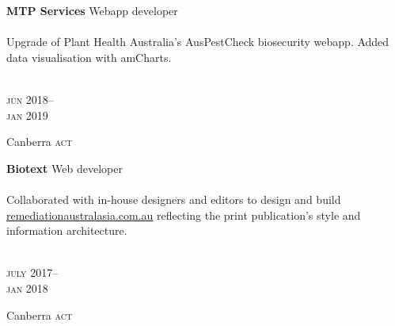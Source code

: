 \begin{minipage}[t]{\mainboxwidth\textwidth}
\textbf{MTP Services}\phantom{..} Webapp developer\\
\\
{\small
Upgrade of Plant Health Australia's AusPestCheck biosecurity webapp. Added 
data visualisation with amCharts.}
\\
\\
{\small
\par}
\end{minipage}
\begin{minipage}[t]{\detailboxwidth\textwidth}
{
\hfill \textsc{jun} 2018--\\ 
\hspace*{0pt} \hfill \textsc{jan} 2019
\par
{\small\hfill Canberra \textsc{act}}
}
\end{minipage}

\begin{minipage}[t]{\mainboxwidth\textwidth}
\textbf{Biotext}\phantom{..} Web developer\\
\\
{\small
Collaborated with in-house designers and editors to design and build 
\href{https://www.remediationaustralasia.com.au/}{remediationaustralasia.com.au} 
reflecting the print publication's style and information architecture.
}
\\
\\
{\small
\par}
\end{minipage}
\begin{minipage}[t]{\detailboxwidth\textwidth}
{
\hfill \textsc{july} 2017--\\ 
\hspace*{0pt} \hfill \textsc{jan} 2018
\par
{\small\hfill Canberra \textsc{act}}
}
\end{minipage}

